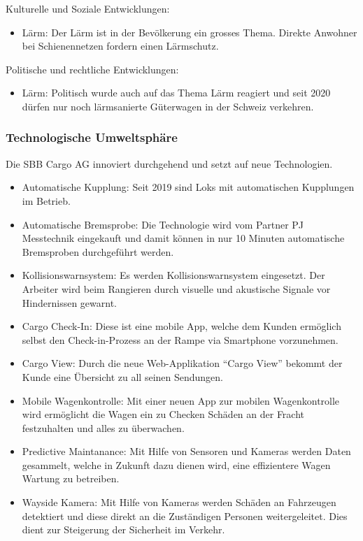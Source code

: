 \documentclass{article}
\begin{document}
Kulturelle und Soziale Entwicklungen:
\begin{itemize}
\item Lärm: Der Lärm ist in der Bevölkerung ein grosses Thema. Direkte Anwohner bei Schienennetzen fordern einen Lärmschutz. 
\end{itemize}
Politische und rechtliche Entwicklungen:
\begin{itemize}
\item Lärm: Politisch wurde auch auf das Thema Lärm reagiert und seit 2020 dürfen nur noch lärmsanierte Güterwagen in der Schweiz verkehren.
\end{itemize}
\parencite[o. S.]{umwelt}

\subsubsection{Technologische Umweltsphäre}

Die SBB Cargo AG innoviert durchgehend und setzt auf neue Technologien.
\begin{itemize}
    \item Automatische Kupplung: Seit 2019 sind Loks mit automatischen Kupplungen im Betrieb.
    \item Automatische Bremsprobe: Die Technologie wird vom Partner PJ Messtechnik eingekauft und damit können in nur 10 Minuten automatische Bremsproben durchgeführt werden.
    \item Kollisionswarnsystem: Es werden Kollisionswarnsystem eingesetzt. Der Arbeiter wird beim Rangieren durch visuelle und akustische Signale vor Hindernissen gewarnt.
    \item Cargo Check-In: Diese ist eine mobile App, welche dem Kunden ermöglich selbst den Check-in-Prozess an der Rampe via Smartphone vorzunehmen.
    \item Cargo View: Durch die neue Web-Applikation “Cargo View” bekommt der Kunde eine Übersicht zu all seinen Sendungen.
    \item Mobile Wagenkontrolle: Mit einer neuen App zur mobilen Wagenkontrolle wird ermöglicht die Wagen ein zu Checken Schäden an der Fracht festzuhalten und alles zu überwachen.
    \item Predictive Maintanance: Mit Hilfe von Sensoren und Kameras werden Daten gesammelt, welche in Zukunft dazu dienen wird, eine effizientere Wagen Wartung zu betreiben.
    \item Wayside Kamera: Mit Hilfe von Kameras werden Schäden an Fahrzeugen detektiert und diese direkt an die Zuständigen Personen weitergeleitet. Dies dient zur Steigerung der Sicherheit im Verkehr.
\end{itemize}
\parencite[o. S.]{innovation}
\end{document}
